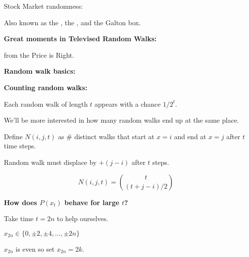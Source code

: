   Stock Market randomness:



    Also known as the ,
    the
    ,
    and the Galton box.


  
  
  \textbf{Great moments in Televised Random Walks:}

    from the Price is Right.
  



  \textbf{Random walk basics:}

  \textbf{Counting random walks:}
    
    
      Each  random walk of
      length $t$ appears with a chance $1/2^{t}$.
    
      We'll be more interested in how many random walks
      end up at the same place.
     
      Define
      $
      N(i,j,t)
      $
      as \# distinct walks that start at $x=i$
      and end at $x=j$ after $t$ time steps.
     
      Random walk must displace by $+(j-i)$ after $t$ steps.
    
      $$ 
      N(i,j,t) = \binom{t}{(t+j-i)/2} 
      $$
    
  



  \textbf{How does $P(x_{t})$ behave for large $t$?}
    
    
      Take time $t=2n$ to help ourselves.
    
      $x_{2n} \in \{0, \pm 2, \pm 4, \ldots, \pm 2n\}$
    
      $x_{2n}$ is even so set $x_{2n} = 2k$.
    
